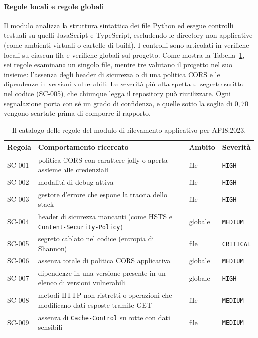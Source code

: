 \paragraph{Regole locali e regole globali}
\label{sec:secmisconfig-rules}

Il modulo analizza la struttura sintattica dei file Python ed esegue controlli
testuali su quelli JavaScript e TypeScript, escludendo le directory non
applicative (come ambienti virtuali o cartelle di build). I
controlli sono articolati in verifiche locali su ciascun file e verifiche
globali sul progetto. Come mostra la Tabella~\ref{tab:regole-secmisconfig}, sei
regole esaminano un singolo file, mentre tre valutano il progetto nel suo
insieme: l'assenza degli header di sicurezza o di una politica CORS e le
dipendenze in versioni vulnerabili. La severità più alta spetta al segreto
scritto nel codice (SC-005), che chiunque legga il repository può riutilizzare.
Ogni
segnalazione porta con sé un grado di confidenza, e quelle sotto la soglia di
$0{,}70$ vengono scartate prima di comporre il rapporto.

\begin{table}[htbp]
  \centering
  \small
  \linespread{1.0}\selectfont
  \renewcommand{\arraystretch}{1.15}
  \begin{tabularx}{\linewidth}{@{}l X l l@{}}
    \toprule
    \textbf{Regola} & \textbf{Comportamento ricercato} & \textbf{Ambito} & \textbf{Severità} \\
    \midrule
    SC-001 & politica CORS con carattere jolly o aperta assieme alle credenziali & file & \texttt{HIGH} \\
    SC-002 & modalità di debug attiva & file & \texttt{HIGH} \\
    SC-003 & gestore d'errore che espone la traccia dello stack & file & \texttt{HIGH} \\
    SC-004 & header di sicurezza mancanti (come HSTS e \texttt{Content-\allowbreak Security-\allowbreak Policy}) & globale & \texttt{MEDIUM} \\
    SC-005 & segreto cablato nel codice (entropia di Shannon) & file & \texttt{CRITICAL} \\
    SC-006 & assenza totale di politica CORS applicativa & globale & \texttt{MEDIUM} \\
    SC-007 & dipendenze in una versione presente in un elenco di versioni vulnerabili & globale & \texttt{HIGH} \\
    SC-008 & metodi HTTP non ristretti o operazioni che modificano dati esposte tramite GET & file & \texttt{MEDIUM} \\
    SC-009 & assenza di \texttt{Cache-Control} su rotte con dati sensibili & file & \texttt{MEDIUM} \\
    \bottomrule
  \end{tabularx}
  \caption[Regole del modulo Security Misconfiguration]{Il catalogo delle regole
  del modulo di rilevamento applicativo per API8:2023.}
  \label{tab:regole-secmisconfig}
\end{table}

